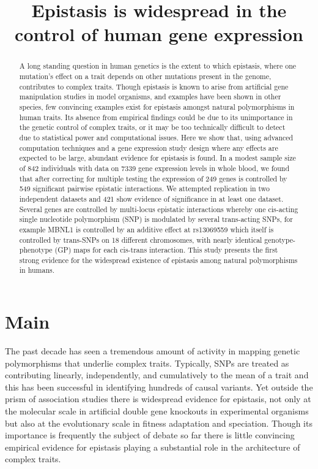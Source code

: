 \documentclass{article}
\title{Epistasis is widespread in the control of human gene expression}
\begin{document}
\maketitle


\begin{abstract}
A long standing question in human genetics is the extent to which epistasis, where one mutation's effect on a trait depends on other mutations present in the genome, contributes to complex traits. Though epistasis is known to arise from artificial gene manipulation studies in model organisms, and examples have been shown in other species, few convincing examples exist for epistasis amongst natural polymorphisms in human traits. Its absence from empirical findings could be due to its unimportance in the genetic control of complex traits, or it may be too technically difficult to detect due to statistical power and computational issues. Here we show that, using advanced computation techniques and a gene expression study design where any effects are expected to be large, abundant evidence for epistasis is found. In a modest sample size of 842 individuals with data on 7339 gene expression levels in whole blood, we found that after correcting for multiple testing the expression of 249 genes is controlled by 549 significant pairwise epistatic interactions. We attempted replication in two independent datasets and 421 show evidence of significance in at least one dataset. Several genes are controlled by multi-locus epistatic interactions whereby one cis-acting single nucleotide polymorphism (SNP) is modulated by several trans-acting SNPs, for example MBNL1 is controlled by an additive effect at rs13069559 which itself is controlled by trans-SNPs on 18 different chromosomes, with nearly identical genotype-phenotype (GP) maps for each cis-trans interaction. This study presents the first strong evidence for the widespread existence of epistasis among natural polymorphisms in humans.
\end{abstract}


\section{Main}

The past decade has seen a tremendous amount of activity in mapping genetic polymorphisms that underlie complex traits. Typically, SNPs are treated as contributing linearly, independently, and cumulatively to the mean of a trait and this has been successful in identifying hundreds of causal variants. Yet outside the prism of association studies there is widespread evidence for epistasis, not only at the molecular scale in artificial double gene knockouts in experimental organisms but also at the evolutionary scale in fitness adaptation and speciation. Though its importance is frequently the subject of debate so far there is little convincing empirical evidence for epistasis playing a substantial role in the architecture of complex traits.
\end{document}
